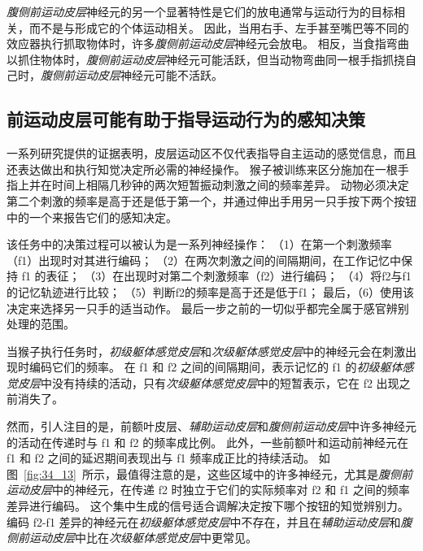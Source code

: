 \textit{腹侧前运动皮层}神经元的另一个显著特性是它们的放电通常与运动行为的目标相关，而不是与形成它的个体运动相关。
因此，当用右手、左手甚至嘴巴等不同的效应器执行抓取物体时，许多\textit{腹侧前运动皮层}神经元会放电。
相反，当食指弯曲以抓住物体时，\textit{腹侧前运动皮层}神经元可能活跃，但当动物弯曲同一根手指抓挠自己时，\textit{腹侧前运动皮层}神经元可能不活跃。



\subsection{前运动皮层可能有助于指导运动行为的感知决策}

一系列研究提供的证据表明，皮层运动区不仅代表指导自主运动的感觉信息，而且还表达做出和执行知觉决定所必需的神经操作。
猴子被训练来区分施加在一根手指上并在时间上相隔几秒钟的两次短暂振动刺激之间的频率差异。
动物必须决定第二个刺激的频率是高于还是低于第一个，并通过伸出手用另一只手按下两个按钮中的一个来报告它们的感知决定。


该任务中的决策过程可以被认为是一系列神经操作：
（1）在第一个刺激频率（f1）出现时对其进行编码；
（2）在两次刺激之间的间隔期间，在工作记忆中保持 f1 的表征；
（3）在出现时对第二个刺激频率（f2）进行编码；
（4）将f2与f1的记忆轨迹进行比较；
（5）判断f2的频率是高于还是低于f1；
最后，（6）使用该决定来选择另一只手的适当动作。
最后一步之前的一切似乎都完全属于感官辨别处理的范围。


当猴子执行任务时，\textit{初级躯体感觉皮层}和\textit{次级躯体感觉皮层}中的神经元会在刺激出现时编码它们的频率。
在 f1 和 f2 之间的间隔期间，表示记忆的 f1 的\textit{初级躯体感觉皮层}中没有持续的活动，只有\textit{次级躯体感觉皮层}中的短暂表示，它在 f2 出现之前消失了。


然而，引人注目的是，前额叶皮层、\textit{辅助运动皮层}和\textit{腹侧前运动皮层}中许多神经元的活动在传递时与 f1 和 f2 的频率成比例。
此外，一些前额叶和运动前神经元在 f1 和 f2 之间的延迟期间表现出与 f1 频率成正比的持续活动。
如图~\ref{fig:34_13}~所示，最值得注意的是，这些区域中的许多神经元，尤其是\textit{腹侧前运动皮层}中的神经元，在传递 f2 时独立于它们的实际频率对 f2 和 f1 之间的频率差异进行编码。 
这个集中生成的信号适合调解决定按下哪个按钮的知觉辨别力。
编码 f2-f1 差异的神经元在\textit{初级躯体感觉皮层}中不存在，并且在\textit{辅助运动皮层}和\textit{腹侧前运动皮层}中比在\textit{次级躯体感觉皮层}中更常见。


